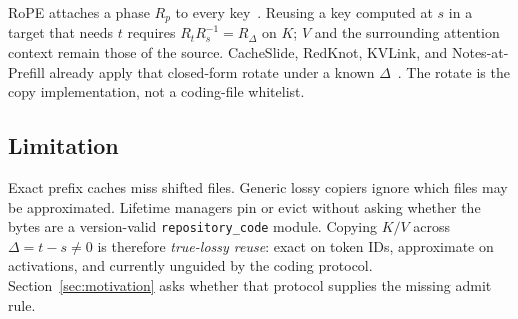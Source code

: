 RoPE attaches a phase $R_p$ to every key~\cite{su2021roformer}. Reusing a
key computed at $s$ in a target that needs $t$ requires
$R_{t} R_{s}^{-1} = R_{\Delta}$ on $K$; $V$ and the surrounding attention
context remain those of the source. CacheSlide, RedKnot, KVLink, and
Notes-at-Prefill already apply that closed-form rotate under a known
$\Delta$~\cite{liu2026cacheslide,liu2026redknot,yang2025kvlink,li2026notes}.
The rotate is the copy implementation, not a coding-file whitelist.

\subsection{Limitation}

Exact prefix caches miss shifted files. Generic lossy copiers ignore
which files may be approximated. Lifetime managers pin or evict without
asking whether the bytes are a version-valid \texttt{repository\_code}
module. Copying $K/V$ across $\Delta = t-s \neq 0$ is therefore
\emph{true-lossy reuse}: exact on token IDs, approximate on activations,
and currently unguided by the coding protocol. Section~\ref{sec:motivation}
asks whether that protocol supplies the missing admit rule.
